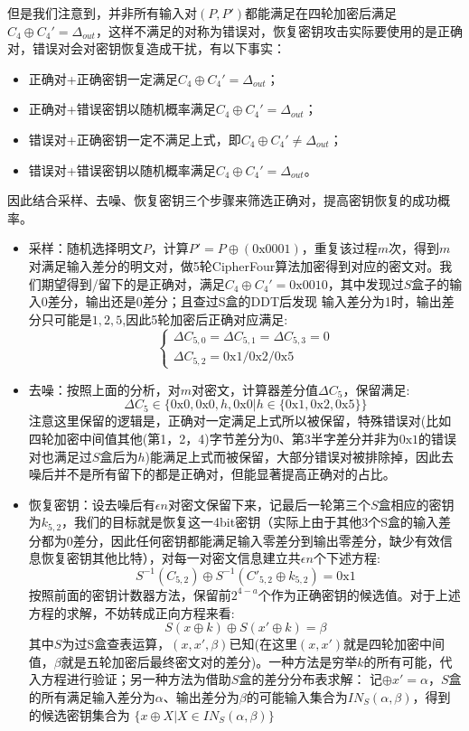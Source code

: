 但是我们注意到，并非所有输入对$(P,P')$都能满足在四轮加密后满足$C_4 \oplus C_4' = \Delta_{out}$，这样不满足的对称为错误对，恢复密钥攻击实际要使用的是正确对，错误对会对密钥恢复造成干扰，有以下事实：
\begin{itemize}
    \item 正确对+正确密钥一定满足$C_4 \oplus C_4' = \Delta_{out}$；
    \item 正确对+错误密钥以随机概率满足$C_4 \oplus C_4' = \Delta_{out}$；
    \item 错误对+正确密钥一定不满足上式，即$C_4 \oplus C_4 ' \not = \Delta_{out}$；
    \item 错误对+错误密钥以随机概率满足$ C_4 \oplus C_4' = \Delta_{out}$。
\end{itemize}
因此结合采样、去噪、恢复密钥三个步骤来筛选正确对，提高密钥恢复的成功概率。
\begin{itemize}
    \item 采样：随机选择明文$P$，计算$P' = P \oplus (\text{0x}0001)$，重复该过程$m$次，得到$m$对满足输入差分的明文对，做5轮CipherFour算法加密得到对应的密文对。我们期望得到/留下的是正确对，满足$C_4 \oplus C_4' = \text{0x}0010$，其中发现过$S$盒子的输入0差分，输出还是0差分；且查过S盒的DDT后发现
输入差分为1时，输出差分只可能是$1,2,5$,因此5轮加密后正确对应满足:
$$
\begin{cases}
    \Delta C_{5,0} = \Delta C_{5,1} = \Delta C_{5,3} = 0\\
    \Delta C_{5,2} = \text{0x}1/\text{0x}2/\text{0x}5
\end{cases}
$$
    \item 去噪：按照上面的分析，对$m$对密文，计算器差分值$\Delta C_5$，保留满足:
    $$
    \Delta C_5 \in \{  \text{0x}0,\text{0x}0  ,h,\text{0x}0 | h \in \{\text{0x}1,\text{0x}2,\text{0x}5\} \}
    $$
    注意这里保留的逻辑是，正确对一定满足上式所以被保留，特殊错误对(比如四轮加密中间值其他(第1，2，4)字节差分为0、第3半字差分并非为$\text{0x}1$的错误对也满足过$S$盒后为$h$)能满足上式而被保留，大部分错误对被排除掉，因此去噪后并不是所有留下的都是正确对，但能显著提高正确对的占比。
    \item 恢复密钥：设去噪后有$\epsilon n$对密文保留下来，记最后一轮第三个$S$盒相应的密钥为$k_{5,2}$，我们的目标就是恢复这一4bit密钥（实际上由于其他3个S盒的输入差分都为0差分，因此任何密钥都能满足输入零差分到输出零差分，缺少有效信息恢复密钥其他比特），对每一对密文信息建立共$\epsilon n$个下述方程:
    $$
    S^{-1}(C_{5,2}) \oplus S^{-1} (C'_{5,2} \oplus k_{5,2}) = \text{0x}1
    $$
    按照前面的密钥计数器方法，保留前$2^{4-a}$个作为正确密钥的候选值。对于上述方程的求解，不妨转成正向方程来看:
    $$
    S(x \oplus k ) \oplus S(x' \oplus k) = \beta
    $$
    其中$S$为过S盒查表运算，$(x,x',\beta)$已知(在这里$(x,x')$就是四轮加密中间值，$\beta$就是五轮加密后最终密文对的差分)。一种方法是穷举$k$的所有可能，代入方程进行验证；另一种方法为借助$S$盒的差分分布表求解：
    记$ \oplus x' = \alpha$，$S$盒的所有满足输入差分为$\alpha$、输出差分为$\beta$的可能输入集合为$IN_S(\alpha,\beta)$，得到的候选密钥集合为
    $\{ x \oplus X | X \in IN_S(\alpha,\beta)  \}$

\end{itemize}

